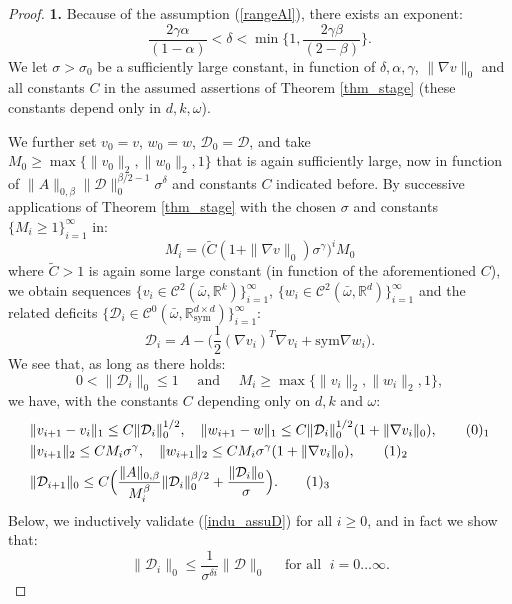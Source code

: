 \documentclass[10pt,a4paper]{amsart}
\newcommand{\R}{\mathbb{R}}
\newcommand{\sym}{\mathrm{sym}}
\begin{document}
\begin{proof}
{\bf 1.} Because of the assumption (\ref{rangeAl}), there exists an exponent:
\begin{equation}\label{exp_del}
\frac{2\gamma\alpha}{(1-\alpha)}< \delta < \min\Big\{1,\frac{2\gamma\beta}{(2-\beta)}\Big\}.
\end{equation} 
We let $\sigma >\sigma_0$ be a sufficiently large constant, in function of
$\delta,\alpha,\gamma$, $\|\nabla v\|_0$ and 
all constants $C$ in the assumed assertions of Theorem
\ref{thm_stage} (these constants depend only in $d,k, \omega$). 

We further set $v_0=v$, $w_0=w$, $\mathcal{D}_0=\mathcal{D}$, and take $M_0\geq \max\{\|v_0\|_2,
\|w_0\|_2,1\}$ that is again sufficiently large, now in function of
$\|A\|_{0,\beta}\|\mathcal{D}\|_0^{\beta/2-1} \sigma^\delta$ and
constants $C$ indicated before.
By successive applications of Theorem \ref{thm_stage} with the chosen $\sigma$ 
and constants $\{M_i\geq 1\}_{i=1}^\infty$ in:
$$M_i = \Big(\tilde C (1+\|\nabla v\|_0) \sigma^\gamma\Big)^iM_0$$
where $\tilde C>1$ is again some large constant (in function of
the aforementioned $C$),
we obtain sequences $\{v_i\in \mathcal{C}^2(\bar\omega,\R^k)\}_{i=1}^\infty$, 
$\{w_i\in\mathcal{C}^2(\bar\omega,\R^d)\}_{i=1}^\infty$ and the related
deficits $\{\mathcal{D}_i \in \mathcal{C}^0(\bar\omega,\R^{d\times d}_\sym)\}_{i=1}^\infty$:
$$\mathcal{D}_i = A-\big(\frac{1}{2}(\nabla v_i)^T\nabla v_i + \sym\nabla w_i\big).$$
We see that, as long as there holds:
\begin{equation}\label{indu_assuD}
0<\|\mathcal{D}_i\|_0\leq 1 \quad \mbox{ and }\quad M_i\geq \max\{\|v_i\|_2,\|w_i\|_2,1\},
\end{equation}
we have, with the constants $C$ depending only on $d, k$ and $\omega$:
\begin{align*}
& \|v_{i+1} - v_i\|_1\leq C\|\mathcal{D}_i\|_0^{1/2}, \quad \|w_{i+1} -
w\|_1\leq C\|\mathcal{D}_i\|_0^{1/2}(1+\|\nabla v_i\|_0),
\tag*{(\theequation)$_1$}\refstepcounter{equation} \label{Bbound1}\vspace{1mm}\\
& \|v_{i+1}\|_2\leq CM_i\sigma^\gamma,\quad \|w_{i+1}\|_2\leq CM_i\sigma^\gamma(1+\|\nabla v_i\|_0),
\tag*{(\theequation)$_2$}\label{Bbound2} \\ 
& \|{\mathcal{D}}_{i+1}\|_0\leq C\Big(\frac{\|A\|_{0,\beta}}{M_i^\beta} \|\mathcal{D}_i\|_0^{\beta/2} +
\frac{\|\mathcal{D}_i\|_0}{\sigma}\Big). \tag*{(\theequation)$_3$} \label{Bbound3}
\end{align*}
Below, we inductively validate  (\ref{indu_assuD}) for all $i\geq 0$,
and in fact we show that:
\begin{equation}\label{import_bd}
\|\mathcal{D}_i\|_0\leq \frac{1}{\sigma^{\delta i}}\|\mathcal{D}\|_0\quad
\mbox{ for all } \; i=0\ldots\infty.
\end{equation}


\end{proof}
\end{document}
